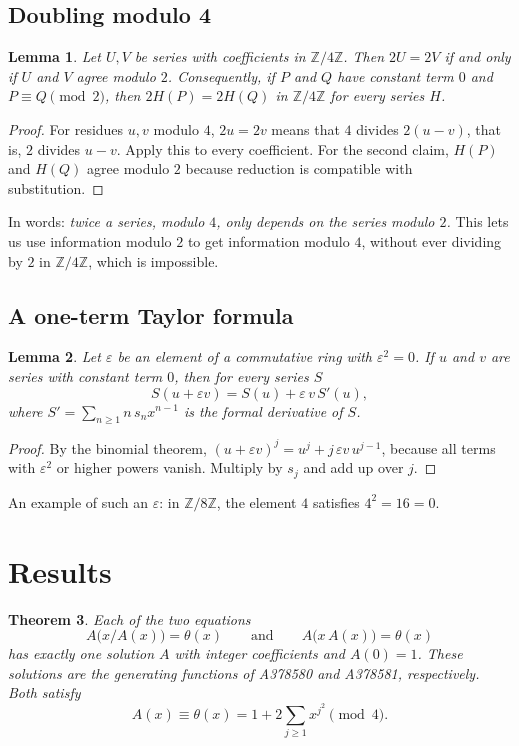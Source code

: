 \documentclass[11pt,a4paper]{article}
\newtheorem{theorem}{Theorem}[section]
\newtheorem{lemma}[theorem]{Lemma}
\theoremstyle{definition}
\theoremstyle{remark}
\newcommand{\Z}{\mathbb{Z}}
\begin{document}
\subsection{Doubling modulo 4}
\begin{lemma}\label{lem:double}
Let $U,V$ be series with coefficients in $\Z/4\Z$. Then $2U=2V$ if and only if $U$ and $V$ agree modulo $2$.
Consequently, if $P$ and $Q$ have constant term $0$ and $P\equiv Q\pmod 2$, then $2H(P)=2H(Q)$ in $\Z/4\Z$ for every
series $H$.
\end{lemma}

\begin{proof}
For residues $u,v$ modulo $4$, $2u=2v$ means that $4$ divides $2(u-v)$, that is, $2$ divides $u-v$. Apply this to
every coefficient. For the second claim, $H(P)$ and $H(Q)$ agree modulo $2$ because reduction is compatible with
substitution.
\end{proof}
In words: \emph{twice a series, modulo $4$, only depends on the series modulo $2$.} This lets us use information modulo
$2$ to get information modulo $4$, without ever dividing by $2$ in $\Z/4\Z$, which is impossible.

\subsection{A one-term Taylor formula}
\begin{lemma}\label{lem:taylor}
Let $\varepsilon$ be an element of a commutative ring with $\varepsilon^2=0$. If $u$ and $v$ are series with constant
term $0$, then for every series $S$
\[
S(u+\varepsilon v)=S(u)+\varepsilon\,v\,S'(u),
\]
where $S'=\sum_{n\ge1}n\,s_nx^{n-1}$ is the formal derivative of $S$.
\end{lemma}

\begin{proof}
By the binomial theorem, $(u+\varepsilon v)^j=u^j+j\,\varepsilon v\,u^{j-1}$, because all terms with
$\varepsilon^2$ or higher powers vanish. Multiply by $s_j$ and add up over $j$.
\end{proof}
An example of such an $\varepsilon$: in $\Z/8\Z$, the element $4$ satisfies $4^2=16=0$.


\section{Results}\label{sec:results}

\begin{theorem}\label{thm:main}
Each of the two equations
\[
A\bigl(x/A(x)\bigr)=\theta(x)\qquad\text{and}\qquad A\bigl(x\,A(x)\bigr)=\theta(x)
\]
has exactly one solution $A$ with integer coefficients and $A(0)=1$. These solutions are the generating functions of
A378580 and A378581, respectively. Both satisfy
\[
A(x)\equiv\theta(x)=1+2\sum_{j\ge1}x^{j^2}\pmod 4 .
\]
\end{theorem}
\end{document}
